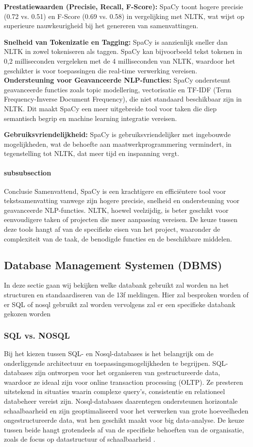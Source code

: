 \textbf{Prestatiewaarden (Precisie, Recall, F-Score):} SpaCy toont hogere precisie (0.72 vs. 0.51) en F-Score (0.69 vs. 0.58) in vergelijking met NLTK, wat wijst op superieure nauwkeurigheid bij het genereren van samenvattingen.

\textbf{Snelheid van Tokenizatie en Tagging:} SpaCy is aanzienlijk sneller dan NLTK in zowel tokeniseren als taggen. SpaCy kan bijvoorbeeld tekst tokenen in 0,2 milliseconden vergeleken met de 4 milliseconden van NLTK, waardoor het geschikter is voor toepassingen die real-time verwerking vereisen.
\textbf{Ondersteuning voor Geavanceerde NLP-functies:} SpaCy ondersteunt geavanceerde functies zoals topic modellering, vectorisatie en TF-IDF (Term Frequency-Inverse Document Frequency), die niet standaard beschikbaar zijn in NLTK. Dit maakt SpaCy een meer uitgebreide tool voor taken die diep semantisch begrip en machine learning integratie vereisen.

\textbf{Gebruiksvriendelijkheid:} SpaCy is gebruiksvriendelijker met ingebouwde mogelijkheden, wat de behoefte aan maatwerkprogrammering vermindert, in tegenstelling tot NLTK, dat meer tijd en inspanning vergt.

\paragraph{subsubsection}{Conclusie}
Samenvattend, SpaCy is een krachtigere en efficiëntere tool voor tekstsamenvatting vanwege zijn hogere precisie, snelheid en ondersteuning voor geavanceerde NLP-functies. NLTK, hoewel veelzijdig, is beter geschikt voor eenvoudigere taken of projecten die meer aanpassing vereisen. De keuze tussen deze tools hangt af van de specifieke eisen van het project, waaronder de complexiteit van de taak, de benodigde functies en de beschikbare middelen.


\subsection{Database Management Systemen (DBMS)}
In deze sectie gaan wij bekijken welke databank gebruikt zal worden na het structuren en standaardiseren van de 13f meldingen. Hier zal besproken worden of er SQL of nosql gebruikt zal worden vervolgens zal er een specifieke databank gekozen worden
\subsubsection{SQL vs. NOSQL}
Bij het kiezen tussen SQL- en Nosql-databases is het belangrijk om de onderliggende architectuur en toepassingsmogelijkheden te begrijpen. SQL-databases zijn ontworpen voor het organiseren van gestructureerde data, waardoor ze ideaal zijn voor online transaction processing (OLTP). Ze presteren uitstekend in situaties waarin complexe query’s, consistentie en relationeel databeheer vereist zijn. Nosql-databases daarentegen ondersteunen horizontale schaalbaarheid en zijn geoptimaliseerd voor het verwerken van grote hoeveelheden ongestructureerde data, wat hen geschikt maakt voor big data-analyse. De keuze tussen beide hangt grotendeels af van de specifieke behoeften van de organisatie, zoals de focus op datastructuur of schaalbaarheid \autocite{khan2023performance}.

